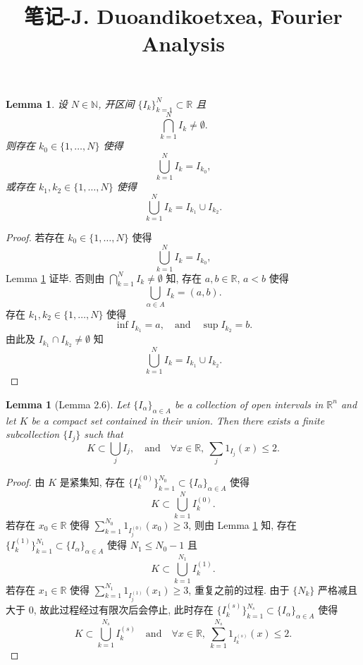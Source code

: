 \documentclass[a4paper,11pt]{article}
\title{笔记-J. Duoandikoetxea, Fourier Analysis}
\newtheorem{lemma}[theorem]{Lemma}
\theoremstyle{definition}
\begin{document}
\begin{CJK*}{UTF8}{gbsn}

\maketitle

\begin{lemma} \label{lem1}
    设 $ N \in \mathbb{N} $, 开区间 $ \{I_k\}_{k = 1}^N \subset \mathbb{R} $ 且
    $$
        \bigcap_{k = 1}^N I_k \neq \emptyset.
    $$
    则存在 $ k_0 \in \{1, \ldots, N\} $ 使得
    $$
        \bigcup_{k = 1}^N I_k = I_{k_0},
    $$
    或存在 $ k_1, k_2 \in \{1, \ldots, N\} $ 使得
    $$
        \bigcup_{k = 1}^N I_k = I_{k_1} \cup I_{k_2}.
    $$
\end{lemma}

\begin{proof}
    若存在 $ k_0 \in \{1, \ldots, N\} $ 使得
    $$
        \bigcup_{k = 1}^N I_k = I_{k_0},
    $$
    Lemma \ref{lem1} 证毕. 
    否则由 $ \bigcap_{k = 1}^N I_k \neq \emptyset $ 知, 
    存在 $ a, b \in \mathbb{R} $, $ a < b $ 使得
    $$
        \bigcup_{\alpha \in A} I_k = (a, b).
    $$
    存在 $ k_1, k_2 \in \{1, \ldots, N\} $ 使得
    $$
        \inf I_{k_1} = a, \quad \text{and} \quad \sup I_{k_2} = b.
    $$
    由此及 $ I_{k_1} \cap I_{k_2} \neq \emptyset $ 知
    $$
        \bigcup_{k = 1}^N I_k = I_{k_1} \cup I_{k_2}.
    $$
\end{proof}

\begin{lemma}[Lemma 2.6]
    Let $ \{ I_\alpha \}_{\alpha \in A} $ be a collection of open intervals in $ \mathbb{R}^n $ 
    and let $ K $ be a compact set contained in their union. Then there exists a finite subcollection
    $ \{ I_j \} $ such that
    $$
        K \subset \bigcup_j I_j, \quad \text{and} \quad 
        \forall x \in \mathbb{R},\ \sum_j \mathrm{1}_{I_j} (x) \leq 2.
    $$
\end{lemma}

\begin{proof}
    由 $ K $ 是紧集知, 存在 $ \{I_k^{(0)}\}_{k = 1}^{N_0} \subset \{ I_\alpha \}_{\alpha \in A} $ 使得
    $$
        K \subset \bigcup_{k = 1}^N I_k^{(0)}.
    $$
    若存在 $ x_0 \in \mathbb{R} $ 使得 $ \sum_{k = 1}^{N_0} \mathrm{1}_{I_j^{(0)}} (x_0) \geq 3 $, 
    则由 Lemma \ref{lem1} 知,
    存在 $ \{I_k^{(1)}\}_{k = 1}^{N_1} \subset \{ I_\alpha \}_{\alpha \in A} $ 使得 $ N_1 \leq N_0 - 1 $ 且
    $$
        K \subset \bigcup_{k = 1}^{N_1} I_k^{(1)}.
    $$
    若存在 $ x_1 \in \mathbb{R} $ 使得 $ \sum_{k = 1}^{N_1} \mathrm{1}_{I_j^{(1)}} (x_1) \geq 3 $, 重复之前的过程.
    由于 $ \{N_k\} $ 严格减且大于 $ 0 $,
    故此过程经过有限次后会停止, 此时存在 $ \{I_k^{(s)}\}_{k = 1}^{N_s} \subset \{ I_\alpha \}_{\alpha \in A} $ 使得
    $$
        K \subset \bigcup_{k = 1}^{N_s} I_k^{(s)} \quad \text{and} \quad 
        \forall x \in \mathbb{R},\ \sum_{k = 1}^{N_s} \mathrm{1}_{I_k^{(s)}} (x) \leq 2.
    $$
\end{proof}



\end{CJK*}
\end{document}
